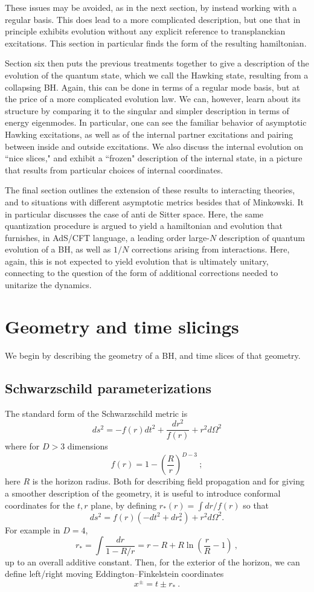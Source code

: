 \documentclass[12pt]{article}
\numberwithin{equation}{section}
\newcommand{\beq}{\begin{equation}}
\newcommand{\eeq}{\end{equation}}
\begin{document}
These issues may be avoided, as in the next section, by  instead working with a regular basis.  This does lead to a more complicated description, but one that in principle exhibits evolution without any explicit reference to transplanckian excitations.  This section in particular finds the form of the resulting hamiltonian.  

Section six then puts the previous treatments together to give a description of the evolution of the quantum state, which we call the Hawking state, resulting from a collapsing BH. Again, this can be done in terms of a regular mode basis, but at the price of a more complicated evolution law.  We can, however, learn about its structure by comparing it to the singular and simpler description in terms of energy eigenmodes.  In particular, one can see the familiar behavior of asymptotic Hawking excitations, as well as of the internal partner excitations and pairing between inside and outside excitations.  We also discuss the internal evolution on ``nice slices," and exhibit a ``frozen" description of the internal state, in a picture that results from particular choices of internal coordinates.  

The final section outlines the extension of these results to interacting theories, and to situations with different asymptotic metrics besides that of Minkowski.  It in particular discusses the case of anti de Sitter space.  Here, the same quantization procedure is argued to yield a hamiltonian and evolution that furnishes, in AdS/CFT language, a leading order large-$N$ description of quantum evolution of a BH, as well as $1/N$ corrections arising from interactions.  Here, again, this is not expected to yield evolution that is ultimately unitary, connecting to the question of the form of additional corrections needed to unitarize the dynamics.



\section{Geometry and time slicings}\label{Slicing}

We begin by describing the geometry of a BH, and time slices of that geometry.

\subsection{Schwarzschild parameterizations} 
The standard form of the Schwarzschild metric is
\beq
\label{Schmet}
ds^2 = -f(r) dt^2 + \frac{dr^2}{f(r)} + r^2 d\Omega^2
\eeq
where for $D>3$ dimensions
\beq
f(r) = 1-\left(\frac{R}{r}\right)^{D-3}\ ;
\eeq
here $R$ is the horizon radius.  Both for describing field propagation and for giving a smoother description of the geometry, it
 is useful to introduce conformal coordinates for the $t,r$ plane, by defining $r_*(r) = \int dr/{f(r)}$ so that
\beq
\label{rstarmet}
ds^2 = f(r)(- dt^2 +dr_*^2) + r^2 d\Omega^2.
\eeq
For example in $D=4$, 
\beq
r_* = \int \frac{dr}{1-R/r} = r-R+R\ln\left(\frac{r}{R}-1\right)\ ,
\eeq
up to an overall additive constant.  
Then, for the exterior of the horizon, we can define left/right moving Eddington--Finkelstein coordinates 
\beq\label{xpdef}
x^\pm = t\pm r_*\ .
\eeq
\end{document}
